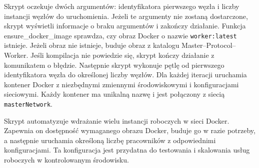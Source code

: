 Skrypt oczekuje dwóch argumentów: identyfikatora pierwszego węzła i liczby instancji węzłów do uruchomienia. Jeżeli te argumenty nie zostaną dostarczone, skrypt wyświetli informacje o braku argumentów i zakończy działanie. Funkcja ensure\_docker\_image sprawdza, czy obraz Docker o nazwie \verb|worker:latest| istnieje. Jeżeli obraz nie istnieje, buduje obraz z katalogu Master--Protocol--Worker. Jeśli kompilacja nie powiedzie się, skrypt kończy działanie z komunikatem o błędzie. Następnie skrypt wykonuje pętlę od pierwszego identyfikatora węzła do określonej liczby węzłów. Dla każdej iteracji uruchamia kontener Docker z niezbędnymi zmiennymi środowiskowymi i konfiguracjami sieciowymi. Każdy kontener ma unikalną nazwę i jest połączony z siecią \verb|masterNetwork|.

Skrypt automatyzuje wdrażanie wielu instancji roboczych w sieci Docker. Zapewnia on dostępność wymaganego obrazu Docker, buduje go w razie potrzeby, a następnie uruchamia określoną liczbę pracowników z odpowiednimi konfiguracjami. Ta konfiguracja jest przydatna do testowania i skalowania usług roboczych w kontrolowanym środowisku.
